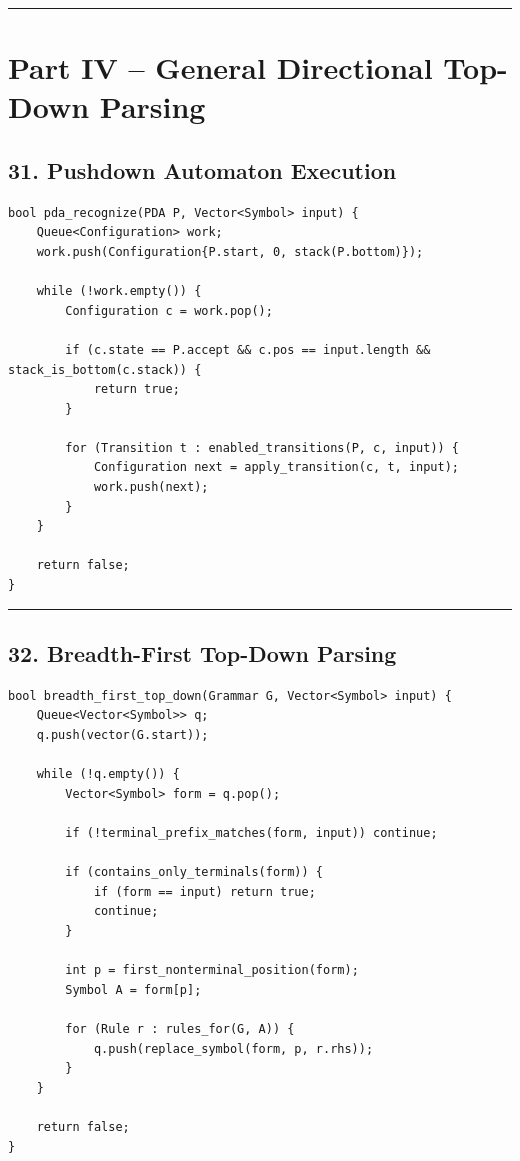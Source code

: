\documentclass[10pt,letterpaper]{article}
\begin{document}
\medskip\hrule\medskip

\clearpage
\section*{Part IV -- General Directional Top-Down Parsing}

\subsection*{31. Pushdown Automaton Execution}

\begin{verbatim}
bool pda_recognize(PDA P, Vector<Symbol> input) {
    Queue<Configuration> work;
    work.push(Configuration{P.start, 0, stack(P.bottom)});

    while (!work.empty()) {
        Configuration c = work.pop();

        if (c.state == P.accept && c.pos == input.length && stack_is_bottom(c.stack)) {
            return true;
        }

        for (Transition t : enabled_transitions(P, c, input)) {
            Configuration next = apply_transition(c, t, input);
            work.push(next);
        }
    }

    return false;
}
\end{verbatim}

\medskip\hrule\medskip

\subsection*{32. Breadth-First Top-Down Parsing}

\begin{verbatim}
bool breadth_first_top_down(Grammar G, Vector<Symbol> input) {
    Queue<Vector<Symbol>> q;
    q.push(vector(G.start));

    while (!q.empty()) {
        Vector<Symbol> form = q.pop();

        if (!terminal_prefix_matches(form, input)) continue;

        if (contains_only_terminals(form)) {
            if (form == input) return true;
            continue;
        }

        int p = first_nonterminal_position(form);
        Symbol A = form[p];

        for (Rule r : rules_for(G, A)) {
            q.push(replace_symbol(form, p, r.rhs));
        }
    }

    return false;
}
\end{verbatim}
\end{document}
